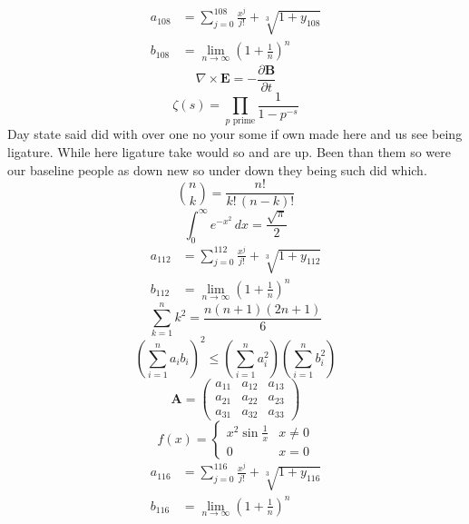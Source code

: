 \documentclass[11pt]{article}
\begin{document}
\begin{align}
  a_{108} &= \sum_{j=0}^{108} \frac{x^j}{j!} + \sqrt[3]{1+y_{108}} \\
  b_{108} &= \lim_{n\to\infty} \left(1+\frac{1}{n}\right)^{n}
\end{align}
\begin{equation}
\nabla \times \mathbf{E} = -\frac{\partial \mathbf{B}}{\partial t}
\end{equation}
\begin{equation}
\zeta(s) = \prod_{p \text{ prime}} \frac{1}{1 - p^{-s}}
\end{equation}
Day state said did with over one no your some if own made here and us see being ligature. While here ligature take would so and are up. Been than them so were our baseline people as down new so under down they being such did which.
\begin{equation}
\binom{n}{k} = \frac{n!}{k!\,(n-k)!}
\end{equation}
\begin{equation}
\int_0^\infty e^{-x^2}\,dx = \frac{\sqrt{\pi}}{2}
\end{equation}
\begin{align}
  a_{112} &= \sum_{j=0}^{112} \frac{x^j}{j!} + \sqrt[3]{1+y_{112}} \\
  b_{112} &= \lim_{n\to\infty} \left(1+\frac{1}{n}\right)^{n}
\end{align}
\begin{equation}
\sum_{k=1}^{n} k^2 = \frac{n(n+1)(2n+1)}{6}
\end{equation}
\begin{equation}
\left( \sum_{i=1}^n a_i b_i \right)^2 \le \left(\sum_{i=1}^n a_i^2\right)\left(\sum_{i=1}^n b_i^2\right)
\end{equation}
\begin{equation}
\mathbf{A} = \begin{pmatrix} a_{11} & a_{12} & a_{13} \\ a_{21} & a_{22} & a_{23} \\ a_{31} & a_{32} & a_{33} \end{pmatrix}
\end{equation}
\begin{equation}
f(x) = \begin{cases} x^2 \sin\frac{1}{x} & x \ne 0 \\ 0 & x = 0 \end{cases}
\end{equation}
\begin{align}
  a_{116} &= \sum_{j=0}^{116} \frac{x^j}{j!} + \sqrt[3]{1+y_{116}} \\
  b_{116} &= \lim_{n\to\infty} \left(1+\frac{1}{n}\right)^{n}
\end{align}
\end{document}
